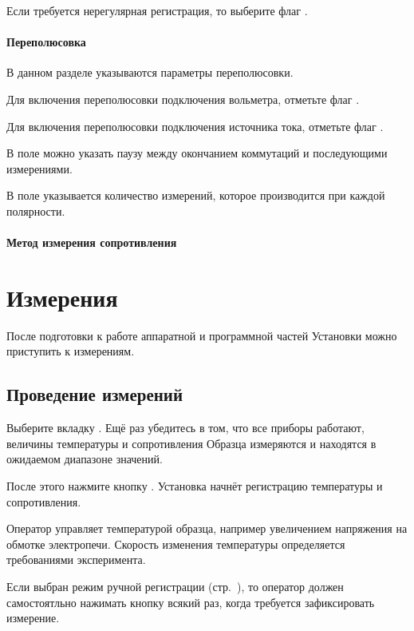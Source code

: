 \documentclass[12pt, a4paper, twocolumn]{report}
\begin{document}
Если требуется нерегулярная регистрация, то выберите флаг .

\subsubsection{Переполюсовка}
\label{sec_switch}

В данном разделе указываются параметры переполюсовки.

Для включения переполюсовки подключения вольметра, отметьте флаг .

Для включения переполюсовки подключения источника тока, отметьте флаг .

В поле  можно указать паузу между окончанием коммутаций и последующими измерениями.

В поле  указывается количество измерений, которое производится при каждой полярности.

\subsubsection{Метод измерения сопротивления}



\chapter{Измерения}

После подготовки к работе аппаратной и программной частей Установки можно приступить к измерениям.

\section{Проведение измерений}

Выберите вкладку . Ещё раз убедитесь в том, что все приборы работают, величины температуры и сопротивления Образца измеряются и находятся в ожидаемом диапазоне значений.

После этого нажмите кнопку . Установка начнёт регистрацию температуры и сопротивления.

Оператор управляет температурой образца, например увеличением напряжения на обмотке электропечи. Скорость изменения температуры определяется требованиями эксперимента.

Если выбран режим ручной регистрации (стр.~\pageref{sec_reg_type_manual}), то оператор должен самостоятльно нажимать кнопку \label{sec_manual} всякий раз, когда требуется зафиксировать измерение.
\end{document}
